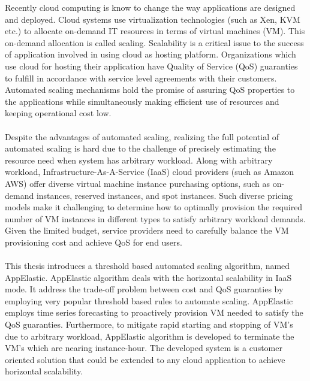 
Recently cloud computing is know to change the way applications are designed and deployed. Cloud systems use virtualization technologies (such as Xen, KVM etc.) to allocate on-demand IT resources in terms of virtual machines (VM). This on-demand allocation is called scaling. Scalability is a critical issue to the success of application involved in using cloud as hosting platform. Organizations which use cloud for hosting their application have Quality of Service (QoS) guaranties to fulfill in accordance with service level agreements with their customers. Automated scaling mechanisms hold the promise of assuring QoS properties to the applications while simultaneously making efficient use of resources and keeping operational cost low.
\\
\\
Despite the advantages of automated scaling, realizing the full potential of automated scaling is hard due to the challenge of precisely estimating the resource need when system has arbitrary workload. Along with arbitrary workload, Infrastructure-As-A-Service (IaaS) cloud providers (such as Amazon AWS) offer diverse virtual machine instance purchasing options, such as on-demand instances, reserved instances, and spot instances. Such diverse pricing models make it challenging to determine how to optimally provision the required number of VM instances in different types to satisfy arbitrary workload demands. Given the limited budget, service providers need to carefully balance the VM provisioning cost and achieve QoS for end users.
\\
\\
This thesis introduces a threshold based automated scaling algorithm, named AppElastic. AppElastic algorithm deals with the horizontal scalability in IaaS mode. It address the trade-off problem between cost and QoS guaranties by employing very popular threshold based rules to automate scaling. AppElastic employs time series forecasting to proactively provision VM needed to satisfy the QoS guaranties. Furthermore, to mitigate rapid starting and stopping of VM's due to arbitrary workload, AppElastic algorithm is developed to terminate the VM's which are nearing instance-hour. The developed system is a customer oriented solution that could be extended to any cloud application to achieve horizontal scalability.
